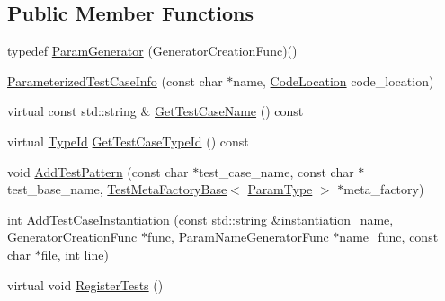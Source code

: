 \subsection*{Public Member Functions}
\begin{DoxyCompactItemize}
\item 
typedef \mbox{\hyperlink{classtesting_1_1internal_1_1_parameterized_test_case_info_a2f6a423f7ae8c7ac24b468538693aa26}{Param\+Generator}} (Generator\+Creation\+Func)()
\item 
\mbox{\hyperlink{classtesting_1_1internal_1_1_parameterized_test_case_info_a6d19f368428260bd5c6e608b4d3fc6af}{Parameterized\+Test\+Case\+Info}} (const char $\ast$name, \mbox{\hyperlink{structtesting_1_1internal_1_1_code_location}{Code\+Location}} code\+\_\+location)
\item 
virtual const std\+::string \& \mbox{\hyperlink{classtesting_1_1internal_1_1_parameterized_test_case_info_a8a9eafc7654b154165f131974397e200}{Get\+Test\+Case\+Name}} () const
\item 
virtual \mbox{\hyperlink{namespacetesting_1_1internal_a38c435cbab5f8b784e2e7f3356cab242}{Type\+Id}} \mbox{\hyperlink{classtesting_1_1internal_1_1_parameterized_test_case_info_a16ed77e95a6042c722d0029744acfc33}{Get\+Test\+Case\+Type\+Id}} () const
\item 
void \mbox{\hyperlink{classtesting_1_1internal_1_1_parameterized_test_case_info_a3e557c888ec5e23b138c2ff254db15e5}{Add\+Test\+Pattern}} (const char $\ast$test\+\_\+case\+\_\+name, const char $\ast$test\+\_\+base\+\_\+name, \mbox{\hyperlink{classtesting_1_1internal_1_1_test_meta_factory_base}{Test\+Meta\+Factory\+Base}}$<$ \mbox{\hyperlink{classtesting_1_1internal_1_1_parameterized_test_case_info_a643a87e178bf92a4246ce21054e44b96}{Param\+Type}} $>$ $\ast$meta\+\_\+factory)
\item 
int \mbox{\hyperlink{classtesting_1_1internal_1_1_parameterized_test_case_info_adefded091e3f20ac3a758029caea3eab}{Add\+Test\+Case\+Instantiation}} (const std\+::string \&instantiation\+\_\+name, Generator\+Creation\+Func $\ast$func, \mbox{\hyperlink{classtesting_1_1internal_1_1_parameterized_test_case_info_aed6c5184cb8f94cec73e9d7c4b7fa2ce}{Param\+Name\+Generator\+Func}} $\ast$name\+\_\+func, const char $\ast$file, int line)
\item 
virtual void \mbox{\hyperlink{classtesting_1_1internal_1_1_parameterized_test_case_info_a7e118820b3074ce70c0440e2e49a50a1}{Register\+Tests}} ()
\end{DoxyCompactItemize}
